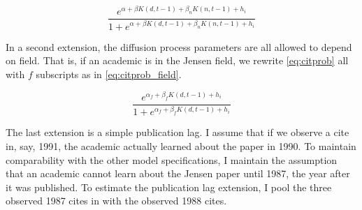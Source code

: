 \begin{equation}
    \frac{e^{\alpha + \beta K(d,t-1) + \beta_n K(n,t-1) + h_i}}{1 + e^{\alpha + \beta K(d,t-1) + \beta_n K(n,t-1) + h_i}}
    \label{eq:citprob_reg}
\end{equation}

In a second extension, the diffusion process parameters are all allowed
to depend on field. That is, if an academic is in the Jensen field, we rewrite
\eqref{eq:citprob} all with $f$ subscripts as in \eqref{eq:citprob_field}.

\begin{equation}
    \frac{e^{\alpha_f + \beta_f K(d,t-1) + h_i}}{1 + e^{\alpha_f + \beta_f K(d,t-1) + h_i}}
    \label{eq:citprob_field}
\end{equation}

The last extension is a simple publication lag.  I assume that if we observe a cite in, say, 1991,
the academic actually learned about the paper in 1990.  To maintain comparability with the other model
specifications, I maintain the assumption that an academic cannot learn about the Jensen paper
until 1987, the year after it was published.  To estimate the publication lag extension,
I pool the three observed 1987 cites in with the observed 1988 cites.

